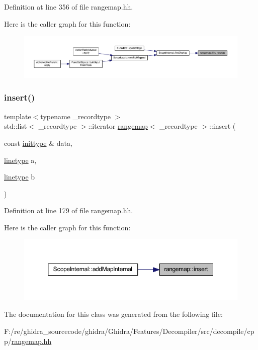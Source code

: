 Definition at line 356 of file rangemap.\+hh.

Here is the caller graph for this function\+:
\nopagebreak
\begin{figure}[H]
\begin{center}
\leavevmode
\includegraphics[width=350pt]{classrangemap_a69c6328ba555fbb5382307ea9a2d9ca9_icgraph}
\end{center}
\end{figure}
\mbox{\label{classrangemap_a076c3184225982a98757fd376b2cb6a5}} 
\subsubsection{\texorpdfstring{insert()}{insert()}}
{\footnotesize\ttfamily template$<$typename \+\_\+recordtype $>$ \\
std\+::list$<$ \+\_\+recordtype $>$\+::iterator \mbox{\hyperlink{classrangemap}{rangemap}}$<$ \+\_\+recordtype $>$\+::insert (\begin{DoxyParamCaption}\item[{const \mbox{\hyperlink{classrangemap_a995e3cdf45bcbbb27c59982353b2256b}{inittype}} \&}]{data,  }\item[{\mbox{\hyperlink{classrangemap_a54c8f7622f9af4c4232d764cf9ed11fa}{linetype}}}]{a,  }\item[{\mbox{\hyperlink{classrangemap_a54c8f7622f9af4c4232d764cf9ed11fa}{linetype}}}]{b }\end{DoxyParamCaption})}



Definition at line 179 of file rangemap.\+hh.

Here is the caller graph for this function\+:
\nopagebreak
\begin{figure}[H]
\begin{center}
\leavevmode
\includegraphics[width=350pt]{classrangemap_a076c3184225982a98757fd376b2cb6a5_icgraph}
\end{center}
\end{figure}


The documentation for this class was generated from the following file\+:\begin{DoxyCompactItemize}
\item 
F\+:/re/ghidra\+\_\+sourcecode/ghidra/\+Ghidra/\+Features/\+Decompiler/src/decompile/cpp/\mbox{\hyperlink{rangemap_8hh}{rangemap.\+hh}}\end{DoxyCompactItemize}
